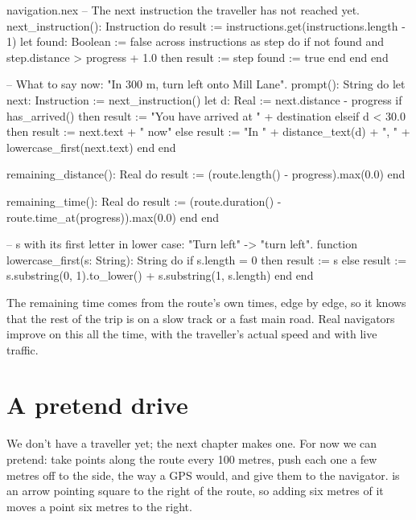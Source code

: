 \begin{continued}{navigation.nex}
  -- The next instruction the traveller has not reached yet.
  next_instruction(): Instruction do
    result := instructions.get(instructions.length - 1)
    let found: Boolean := false
    across instructions as step do
      if not found and step.distance > progress + 1.0 then
        result := step
        found := true
      end
    end
  end

  -- What to say now: "In 300 m, turn left onto Mill Lane".
  prompt(): String do
    let next: Instruction := next_instruction()
    let d: Real := next.distance - progress
    if has_arrived() then
      result := "You have arrived at " + destination
    elseif d < 30.0 then
      result := next.text + " now"
    else
      result := "In " + distance_text(d) + ", " + lowercase_first(next.text)
    end
  end

  remaining_distance(): Real do
    result := (route.length() - progress).max(0.0)
  end

  remaining_time(): Real do
    result := (route.duration() - route.time_at(progress)).max(0.0)
  end
end

-- s with its first letter in lower case: "Turn left" -> "turn left".
function lowercase_first(s: String): String do
  if s.length = 0 then
    result := s
  else
    result := s.substring(0, 1).to_lower() + s.substring(1, s.length)
  end
end
\end{continued}

The remaining time comes from the route's own times, edge by edge, so it
knows that the rest of the trip is on a slow track or a fast main road.
Real navigators improve on this all the time, with the traveller's actual
speed and with live traffic.

\section{A pretend drive}

We don't have a traveller yet; the next chapter makes one. For now we can
pretend: take points along the route every 100 metres, push each one a few
metres off to the side, the way a GPS would, and give them to the
navigator.  is an arrow pointing square to
the right of the route, so adding six metres of it moves a point six metres
to the right.

